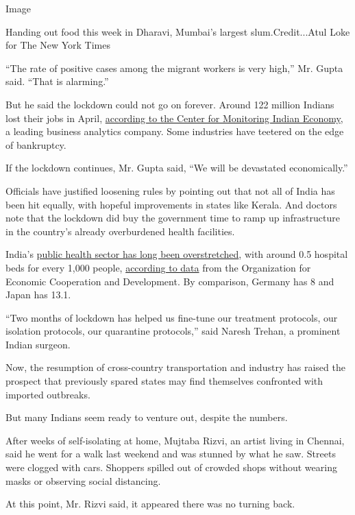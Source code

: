Image

Handing out food this week in Dharavi, Mumbai's largest
slum.Credit...Atul Loke for The New York Times

``The rate of positive cases among the migrant workers is very high,''
Mr. Gupta said. ``That is alarming.''

But he said the lockdown could not go on forever. Around 122 million
Indians lost their jobs in April,
\href{https://www.thehindu.com/data/data-over-12-crore-indians-lost-their-jobs-during-the-coronavirus-lockdown-in-april/article31520715.ece}{according
to the Center for Monitoring Indian Economy}, a leading business
analytics company. Some industries have teetered on the edge of
bankruptcy.

If the lockdown continues, Mr. Gupta said, ``We will be devastated
economically.''

Officials have justified loosening rules by pointing out that not all of
India has been hit equally, with hopeful improvements in states like
Kerala. And doctors note that the lockdown did buy the government time
to ramp up infrastructure in the country's already overburdened health
facilities.

India's
\href{https://www.business-standard.com/article/current-affairs/india-worse-than-bhutan-bangladesh-in-healthcare-ranks-145th-globally-118052400135_1.html}{public
health sector has long been overstretched}, with around 0.5 hospital
beds for every 1,000 people,
\href{https://data.oecd.org/healtheqt/hospital-beds.htm}{according to
data} from the Organization for Economic Cooperation and Development. By
comparison, Germany has 8 and Japan has 13.1.

``Two months of lockdown has helped us fine-tune our treatment
protocols, our isolation protocols, our quarantine protocols,'' said
Naresh Trehan, a prominent Indian surgeon.

Now, the resumption of cross-country transportation and industry has
raised the prospect that previously spared states may find themselves
confronted with imported outbreaks.

But many Indians seem ready to venture out, despite the numbers.

After weeks of self-isolating at home, Mujtaba Rizvi, an artist living
in Chennai, said he went for a walk last weekend and was stunned by what
he saw. Streets were clogged with cars. Shoppers spilled out of crowded
shops without wearing masks or observing social distancing.

At this point, Mr. Rizvi said, it appeared there was no turning back.

